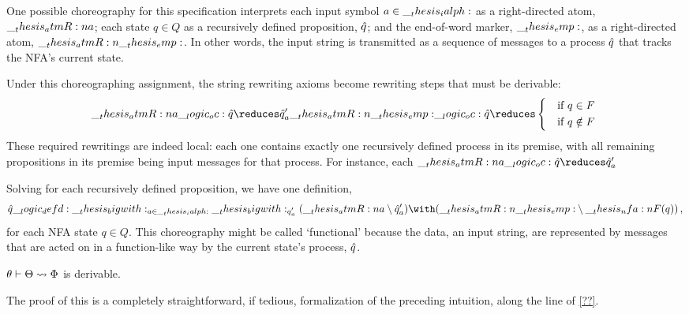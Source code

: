 One possible choreography for this specification interprets each input symbol $a \in \__thesis_ialph:$ as a right-directed atom, $\__thesis_atmR:n {a}$; each state $q \in Q$ as a recursively defined proposition, $\hat{q}$; and the end-of-word marker, $\__thesis_emp:$, as a right-directed atom, $\__thesis_atmR:n {\__thesis_emp:}$.
In other words, the input string is transmitted as a sequence of messages to a process $\hat{q}$ that tracks the \ac{NFA}'s current state.


Under this choreographing assignment, the string rewriting axioms become rewriting steps that must be derivable:
\begin{equation*}
  \atmR{a} \oc \defp{q}
    \reduces \defp{q}'_a
  \atmR{\emp} \oc \defp{q}
    \reduces \begin{cases*}
               & if $q \in F$ \\
               & if $q \notin F$
             \end{cases*}
\end{equation*}
These required rewritings are indeed local: each one contains exactly one recursively defined process in its premise, with all remaining propositions in its premise being input messages for that process.
For instance, each $\atmR{a} \oc \defp{q} \reduces \defp{q}'_a$

Solving for each recursively defined proposition, we have one definition, 
\begin{equation*}
  \defp{q} \defd \bigwith_{a \in \ialph} \bigwith_{q\smash{'_a}} (\atmR{a} \limp \defp{q}'_a) \with (\atmR{\emp} \limp \nfa{F}(q))
  \,,
\end{equation*}
for each \ac{NFA} state $q \in Q$.
This choreography might be called \enquote*{functional} because the data, an input string, are represented by messages that are acted on in a function-like way by the current state's process, $\hat{q}$.

\begin{theorem}\label{thm:choreographies:nfa-functional-chorsig}
  $\theta \vdash \Theta \rightsquigarrow \Phi$ is derivable.
\end{theorem}
%
\noindent
The proof of this  is a completely straightforward, if tedious, formalization of the preceding intuition, along the line of \cref{??}.

